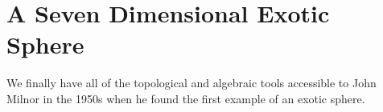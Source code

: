 \chapter{A Seven Dimensional Exotic Sphere}

We finally have all of the topological and algebraic tools accessible to John Milnor in the 1950s when he found the first example of an exotic sphere.

